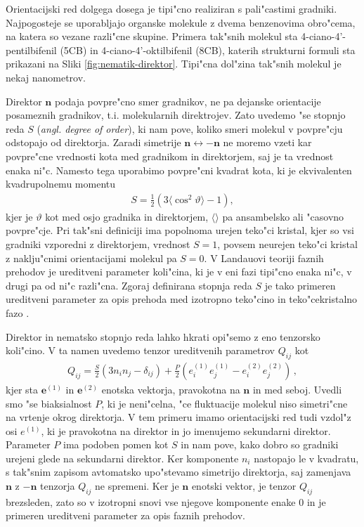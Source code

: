 \documentclass[12pt,twoside,openright,final,a4paper]{report}
\newcommand{\angl}[1]{(\textit{angl. #1})}
\begin{document}
Orientacijski red dolgega dosega je tipi"cno realiziran s pali"castimi gradniki. 
Najpogosteje se uporabljajo organske molekule z dvema benzenovima obro"cema, na katera so vezane razli"cne skupine. 
Primera tak"snih molekul sta 4-ciano-4'-pentilbifenil (5CB) in 4-ciano-4'-oktilbifenil (8CB), katerih strukturni formuli sta prikazani na Sliki \ref{fig:nematik-direktor}. 
Tipi"cna dol"zina tak"snih molekul je nekaj nanometrov. 

Direktor $\mathbf{n}$ podaja povpre"cno smer gradnikov, ne pa dejanske orientacije posameznih gradnikov, t.i. molekularnih direktrojev. 
Zato uvedemo "se stopnjo reda $S$ \angl{degree of order}, ki nam pove, koliko smeri molekul v povpre"cju odstopajo od direktorja. 
Zaradi simetrije $\mathbf{n} \leftrightarrow -\mathbf{n}$ ne moremo vzeti kar povpre"cne vrednosti kota med gradnikom in direktorjem, saj je ta vrednost enaka ni"c. 
Namesto tega uporabimo povpre"cni kvadrat kota, ki je ekvivalenten kvadrupolnemu momentu \cite{kleman}
\begin{align}
 S = \frac{1}{2}\left(3\langle\cos^2\vartheta\rangle-1\right),
\end{align}
kjer je $\vartheta$ kot med osjo gradnika in direktorjem, $\langle\rangle$ pa ansambelsko ali "casovno povpre"cje. 
Pri tak"sni definiciji ima popolnoma urejen teko"ci kristal, kjer so vsi gradniki vzporedni z direktorjem, vrednost $S=1$, povsem neurejen teko"ci kristal z naklju"cnimi orientacijami molekul pa $S=0$. 
V Landauovi teoriji faznih prehodov je ureditveni parameter koli"cina, ki je v eni fazi tipi"cno enaka ni"c, v drugi pa od ni"c razli"cna. 
Zgoraj definirana stopnja reda $S$ je tako primeren ureditveni parameter za opis prehoda med izotropno teko"cino in teko"cekristalno fazo \cite{degennes}. 

Direktor in nematsko stopnjo reda lahko hkrati opi"semo z eno tenzorsko koli"cino. V ta namen uvedemo tenzor ureditvenih parametrov $Q_{ij}$ kot
\begin{align}
  Q_{ij} = \frac{S}{2}(3n_i n_j - \delta_{ij}) + \frac{P}{2}(e^{(1)}_i e^{(1)}_j - e^{(2)}_i e^{(2)}_j)\,,
\end{align}
kjer sta $\mathbf{e}^{(1)}$ in $\mathbf{e}^{(2)}$ enotska vektorja, pravokotna na $\mathbf{n}$ in med seboj. 
Uvedli smo "se biaksialnost $P$, ki je neni"celna, "ce fluktuacije molekul niso simetri"cne na vrtenje okrog direktorja. 
V tem primeru imamo orientacijski red tudi vzdol"z osi $e^{(1)}$, ki je pravokotna na direktor in jo imenujemo sekundarni direktor. 
Parameter $P$ ima podoben pomen kot $S$ in nam pove, kako dobro so gradniki urejeni glede na sekundarni direktor. 
Ker komponente $n_i$ nastopajo le v kvadratu, s tak"snim zapisom avtomatsko upo"stevamo simetrijo direktorja, saj zamenjava $\mathbf{n}$ z $-\mathbf{n}$ tenzorja $Q_{ij}$ ne spremeni. 
Ker je $\mathbf{n}$ enotski vektor, je tenzor $Q_{ij}$ brezsleden, zato so v izotropni snovi vse njegove komponente enake 0 in je primeren ureditveni parameter za opis faznih prehodov. 
\end{document}
